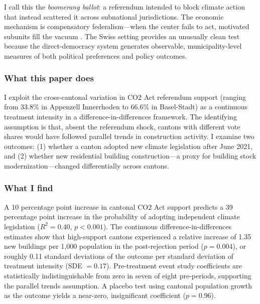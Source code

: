 \documentclass[12pt]{article}
\begin{document}
I call this the \textit{boomerang ballot}: a referendum intended to block climate action that instead scattered it across subnational jurisdictions. The economic mechanism is compensatory federalism---when the center fails to act, motivated subunits fill the vacuum \citep{oates1999essay, volden2005intergovernmental}. The Swiss setting provides an unusually clean test because the direct-democracy system generates observable, municipality-level measures of both political preferences and policy outcomes.

\subsubsection*{What this paper does} I exploit the cross-cantonal variation in CO2 Act referendum support (ranging from 33.8\% in Appenzell Innerrhoden to 66.6\% in Basel-Stadt) as a continuous treatment intensity in a difference-in-differences framework. The identifying assumption is that, absent the referendum shock, cantons with different vote shares would have followed parallel trends in construction activity. I examine two outcomes: (1) whether a canton adopted new climate legislation after June 2021, and (2) whether new residential building construction---a proxy for building stock modernization---changed differentially across cantons.

\subsubsection*{What I find} A 10 percentage point increase in cantonal CO2 Act support predicts a 39 percentage point increase in the probability of adopting independent climate legislation ($R^2 = 0.40$, $p < 0.001$). The continuous difference-in-differences estimates show that high-support cantons experienced a relative increase of 1.35 new buildings per 1,000 population in the post-rejection period ($p = 0.004$), or roughly 0.11 standard deviations of the outcome per standard deviation of treatment intensity (SDE $= 0.17$). Pre-treatment event study coefficients are statistically indistinguishable from zero in seven of eight pre-periods, supporting the parallel trends assumption. A placebo test using cantonal population growth as the outcome yields a near-zero, insignificant coefficient ($p = 0.96$).
\end{document}
